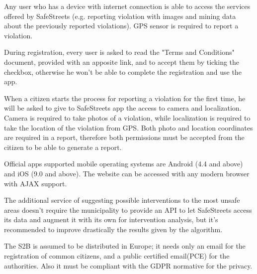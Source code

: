 Any user who has a device with internet connection is able to access the services offered by SafeStreets (e.g. reporting violation with images and mining data about the previously reported violations). GPS sensor is required to report a violation.

During registration, every user is asked to read the "Terms and Conditions" document, provided with an apposite link, and to accept them by ticking the checkbox, otherwise he won't be able to complete the registration and use the app.

When a citizen starts the process for reporting a violation for the first time, he will be asked to give to SafeStreets app the access to camera and localization. Camera is required to take photos of a violation, while localization is required to take the location of the violation from GPS. Both photo and location coordinates are required in a report, therefore both permissions must be accepted from the citizen to be able to generate a report.

Official apps supported mobile operating systems are Android (4.4 and above) and iOS (9.0 and above). The website can be accessed with any modern browser with AJAX support.

The additional service of suggesting possible interventions to the most unsafe areas doesn't require the municipality to provide an API to let SafeStreets access its data and augment it with its own for intervention analysis, but it's recommended to improve drastically the results given by the algorithm.

The S2B is assumed to be distributed in Europe; it needs only an email for the registration of common citizens, and a public certified email(PCE) for the authorities. Also it must be compliant with the GDPR normative for the privacy.